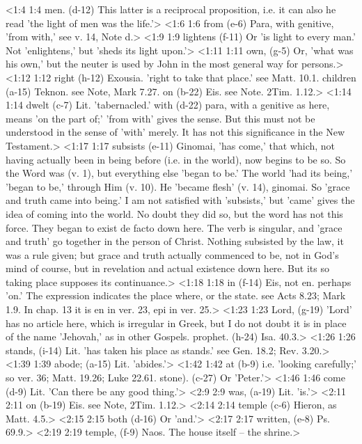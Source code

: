 <1:4 1:4  men. (d-12)  This latter is a reciprocal proposition, i.e. it can also he  read 'the light of men was the life.'>
<1:6 1:6  from (e-6)  Para, with genitive, 'from with,' see v. 14, Note d.>
<1:9 1:9  lightens (f-11)  Or 'is light to every man.' Not 'enlightens,' but 'sheds its  light upon.'>
<1:11 1:11  own, (g-5)  Or, 'what was his own,' but the neuter is used by John in the  most general way for persons.>
<1:12 1:12  right (h-12)  Exousia. 'right to take that place.' see Matt. 10.1.
  children (a-15)  Teknon. see Note, Mark 7.27.
  on (b-22)  Eis. see Note. 2Tim. 1.12.>
<1:14 1:14  dwelt (c-7)  Lit. 'tabernacled.'
  with (d-22)  para,  with a genitive as here, means 'on the part of;'  'from with' gives the sense. But this must not be understood in  the sense of 'with' merely. It has not this significance in the  New Testament.>
<1:17 1:17  subsists (e-11)  Ginomai, 'has come,' that which, not having actually been  in being before (i.e. in the world), now begins to be so. So  the Word was (v. 1), but everything else 'began to be.' The  world 'had its being,' 'began to be,' through Him (v. 10). He  'became flesh' (v. 14), ginomai. So 'grace and truth came  into being.' I am not satisfied with 'subsists,' but 'came'  gives the idea of coming into the world. No doubt they did so,  but the word has not this force. They began to exist de facto  down here. The verb is singular, and 'grace and truth' go  together in the person of Christ. Nothing subsisted by the law,  it was a rule given; but grace and truth actually commenced to  be, not in God's mind of course, but in revelation and actual  existence down here. But its so taking place supposes its  continuance.>
<1:18 1:18  in (f-14)  Eis, not en. perhaps 'on.' The expression indicates the  place where, or the state. see Acts 8.23; Mark 1.9. In chap. 13  it is en in ver. 23, epi in ver. 25.>
<1:23 1:23  Lord, (g-19)  'Lord' has no article here, which is irregular in Greek, but  I do not doubt it is in place of the name 'Jehovah,' as in  other Gospels.
  prophet. (h-24)  Isa. 40.3.>
<1:26 1:26  stands, (i-14)  Lit. 'has taken his place as stands.' see Gen. 18.2; Rev.  3.20.>
<1:39 1:39  abode; (a-15)  Lit. 'abides.'>
<1:42 1:42  at (b-9)  i.e. 'looking carefully;' so ver. 36; Matt. 19.26; Luke 22.61.
  stone). (c-27)  Or 'Peter.'>
<1:46 1:46  come (d-9)  Lit. 'Can there be any good thing.'>
<2:9 2:9  was, (a-19)  Lit. 'is.'>
<2:11 2:11  on (b-19)  Eis. see Note, 2Tim. 1.12.>
<2:14 2:14  temple (c-6)  Hieron, as Matt. 4.5.>
<2:15 2:15  both (d-16)  Or 'and.'>
<2:17 2:17  written, (e-8)  Ps. 69.9.>
<2:19 2:19  temple, (f-9)  Naos. The house itself -- the shrine.>

